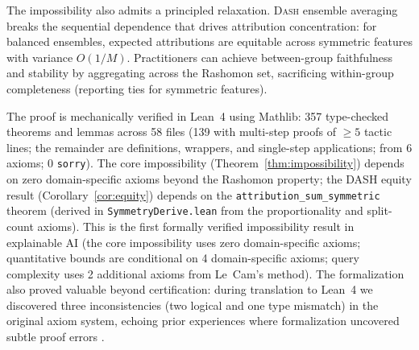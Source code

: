 \documentclass{article}
\newcommand{\DASH}{\textsc{Dash}}
\begin{document}
The impossibility also admits a principled relaxation.
\DASH{} ensemble averaging breaks the sequential dependence that drives attribution concentration: for balanced ensembles, expected attributions are equitable across symmetric features with variance $O(1/M)$.
Practitioners can achieve between-group faithfulness and stability by aggregating across the Rashomon set, sacrificing within-group completeness (reporting ties for symmetric features).

\begin{sloppypar}
The proof is mechanically verified in Lean~4 using Mathlib: 357 type-checked theorems
and lemmas across 58 files (139 with multi-step proofs of ${\geq}5$ tactic lines; the
remainder are definitions, wrappers, and single-step applications; from 6
axioms; 0 \texttt{sorry}).
The core impossibility (Theorem~\ref{thm:impossibility}) depends on zero domain-specific axioms
beyond the Rashomon property; the DASH equity result (Corollary~\ref{cor:equity})
depends on the \texttt{attribution\_sum\_symmetric} theorem (derived in
\texttt{SymmetryDerive.lean} from the proportionality and split-count axioms).
This is the first formally verified impossibility result in
explainable AI (the core impossibility uses zero domain-specific axioms; quantitative bounds are
conditional on 4 domain-specific axioms; query complexity uses 2 additional axioms
from Le~Cam's method).
The formalization also proved valuable beyond certification: during translation to
Lean~4 we discovered three inconsistencies (two logical and one type mismatch) in the
original axiom system, echoing prior experiences where formalization uncovered subtle
proof errors \citep{nipkow2009social,zhang2026statistical}.
\end{sloppypar}
\end{document}
